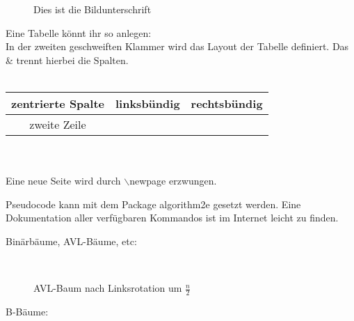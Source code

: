 \documentclass[a4paper]{scrartcl}
\begin{document}
\begin{figure}[H]
\centering
\caption{Dies ist die Bildunterschrift}
\end{figure}

Eine Tabelle könnt ihr so anlegen:\\
In der zweiten geschweiften Klammer wird das Layout der Tabelle definiert. Das \& trennt hierbei die Spalten.\\
\ \\ %
\begin{tabular}{c|lr}
  zentrierte Spalte & linksbündig & rechtsbündig\\
  \hline
  zweite Zeile & \\
\end{tabular}\\
\ \\
Eine neue Seite wird durch $\backslash$newpage erzwungen.
\newpage


Pseudocode kann mit dem Package algorithm2e gesetzt werden. Eine Dokumentation aller verfügbaren Kommandos ist im Internet leicht zu finden.


\vspace{1cm}

Binärbäume, AVL-Bäume, etc: \\

\begin{figure}[h!]
\centering
{}\\

\caption{AVL-Baum nach Linksrotation um $\frac{n}{2}$}
\end{figure}

\vspace{1cm}

B-Bäume: \\
\end{document}
